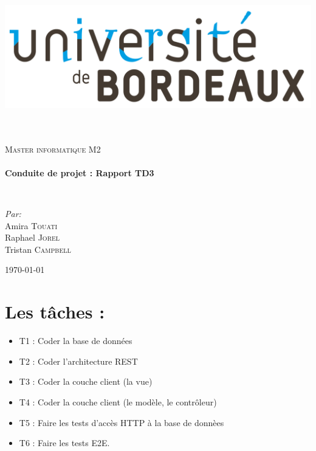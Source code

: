 \documentclass[a4paper,10pt]{report}
\begin{document}
\begin{titlepage}
\begin{center}

	~~~~~~~\includegraphics[scale=0.7]{university.png}~~~~~~~~~

		\HRule \\[2cm]
		\textsc{Master informatique M2}\\
		\HRule \\[2cm]

		{ \huge \bfseries Conduite de projet : Rapport TD3 \\[0.4cm] }

		\HRule \\[2cm]

		\noindent
		\begin{minipage}{0.5\textwidth}
		\begin{flushleft} \large
		\emph{Par:}\\
		\smallbreak
		Amira \textsc{Touati}\\
		Raphael \textsc{Jorel}\\
		Tristan \textsc{ Campbell}
		\end{flushleft}
		\end{minipage}%


		\vfill
		{\large \today}
		\end{center}

	\end{titlepage}
	\newpage
\section*{Les tâches :}
	\begin{itemize}
        \item T1 : Coder la base de données
        \item T2 : Coder l'architecture REST
        \item T3 : Coder la couche client (la vue)
        \item T4 : Coder la couche client (le modèle, le contrôleur)
        \item T5 : Faire les tests d'accès HTTP à la base de donnèes
        \item T6 : Faire les tests E2E.
    \end{itemize}
\end{document}
